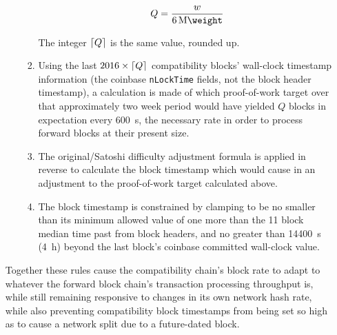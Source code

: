 \begin{enumerate}
\begin{enumerate}
\begin{enumerate}
        \begin{equation}
          Q = \frac{w}{\SI{6}{\mega\weight}}
        \end{equation}


        The integer $\lceil Q\rceil$ is the same value, rounded up.

      \item

        Using the last $2016 \times \lceil Q\rceil$ compatibility blocks'
        wall-clock timestamp information (the coinbase {\tt nLockTime}
        fields, not the block header timestamp), a calculation is made
        of which proof-of-work target over that approximately two week
        period would have yielded $Q$ blocks in expectation
        every \SI{600}{\second}, the necessary rate in order to
        process forward blocks at their present size.

      \item

        The original/Satoshi difficulty adjustment formula is applied
        in reverse to calculate the block timestamp which would cause
        in an adjustment to the proof-of-work target calculated above.

      \item

        The block timestamp is constrained by clamping to be no
        smaller than its minimum allowed value of one more than
        the \num{11} block median time past from block headers, and no
        greater than \SI{14400}{\second} (\SI{4}{\hour}) beyond the
        last block's coinbase committed wall-clock
        value.

    \end{enumerate}

\end{enumerate}

Together these rules cause the compatibility chain's block rate to
adapt to whatever the forward block chain's transaction processing
throughput is, while still remaining responsive to changes in its own
network hash rate, while also preventing compatibility block
timestamps from being set so high as to cause a network split due to a
future-dated block.


\end{enumerate}
